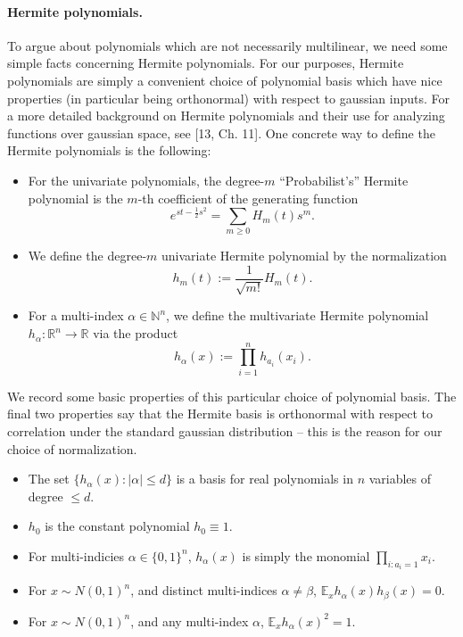 \documentclass[10pt,a4paper]{article}
\begin{document}
\paragraph{Hermite polynomials.} To argue about polynomials which are not necessarily multilinear, we need some simple facts concerning Hermite polynomials. For our purposes, Hermite polynomials are simply a convenient choice of polynomial basis which have nice properties (in particular being orthonormal) with respect to gaussian inputs. For a more detailed background on Hermite polynomials and their use for analyzing functions over gaussian space, see [13, Ch. 11].
One concrete way to define the Hermite polynomials is the following:
\begin{itemize}
\item For the univariate polynomials, the degree-$m$ ``Probabilist's'' Hermite polynomial is the $m$-th coefficient of the generating function
\[e^{st-\frac12s^2}=\sum_{m\geq0}H_m(t)s^m.\]
\item We define the degree-$m$ univariate Hermite polynomial by the normalization
\[h_m(t):=\frac1{\sqrt{m!}}H_m(t).\]
\item For a multi-index $\alpha\in\mathbb N^n$, we define the multivariate Hermite polynomial $h_\alpha:\mathbb R^n\to\mathbb R$ via the product
\[h_\alpha(x):=\prod_{i=1}^nh_{a_i}(x_i).\]
\end{itemize}
We record some basic properties of this particular choice of polynomial basis. The final two properties say that the Hermite basis is orthonormal with respect to correlation under the standard gaussian distribution -- this is the reason for our choice of normalization.
\begin{itemize}
\item The set $\{h_\alpha(x):|\alpha|\leq d\}$ is a basis for real polynomials in $n$ variables of degree $\leq d$.
\item $h_0$ is the constant polynomial $h_0\equiv1$.
\item For multi-indicies $\alpha\in\{0,1\}^n$, $h_\alpha(x)$ is simply the monomial $\prod_{i:a_i=1}x_i$.
\item For $x\sim N(0,1)^n$, and distinct multi-indices $\alpha\neq\beta$, $\mathbb E_xh_\alpha(x)h_\beta(x)=0$.
\item For $x\sim N(0,1)^n$, and any multi-index $\alpha$, $\mathbb E_xh_\alpha(x)^2=1$.
\end{itemize}
\end{document}
